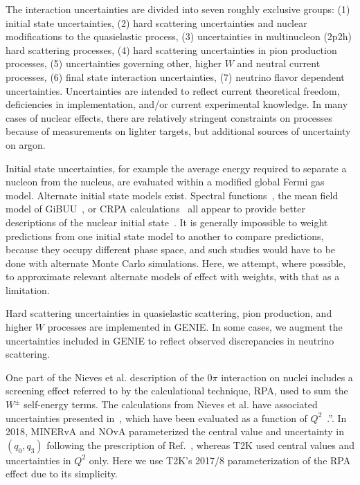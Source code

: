 The interaction uncertainties are divided into seven roughly exclusive groups: (1) initial state uncertainties, (2) hard scattering uncertainties and nuclear modifications to the quasielastic process, (3) uncertainties in multinucleon (2p2h) hard scattering processes, (4) hard scattering uncertainties in pion production processes, (5) uncertainties governing other, higher $W$ and neutral current processes, (6) final state interaction uncertainties, (7) neutrino flavor dependent uncertainties. Uncertainties are intended to reflect current theoretical freedom, deficiencies in implementation, and/or current experimental knowledge.  In many cases of nuclear effects, there are relatively stringent constraints on processes because of measurements on lighter targets, but additional sources of uncertainty on argon. 


Initial state uncertainties, for example the average energy required to separate a nucleon from the nucleus, are evaluated within a modified global Fermi gas model.  Alternate initial state models exist. Spectral functions~\cite{Benhar:1994hw,Nieves:2004wx}, the mean field model of GiBUU~\cite{Gallmeister:2016dnq}, or CRPA calculations~\cite{Pandey:2014tza} all appear to  provide better descriptions of the nuclear initial state~\cite{Sobczyk:2017mts}.   It is generally impossible to weight predictions from one initial state model to another to compare predictions, because they occupy different phase space, and such studies would have to be done with alternate Monte Carlo simulations. Here, we attempt, where possible, to approximate relevant alternate models of effect with weights, with that as a limitation.

Hard scattering uncertainties in quasielastic scattering,  pion production, and higher $W$ processes are implemented in GENIE.  In some cases, we augment the uncertainties included in GENIE to reflect observed discrepancies in neutrino scattering.

One part of the Nieves et al.\cite{nieves1,nieves2} description of the $0\pi$ interaction on nuclei includes a screening effect referred to by the calculational technique, RPA, used to sum the $W^\pm$ self-energy terms. 
The calculations from Nieves et al. have associated uncertainties presented in \cite{nieves_uncert}, which have been evaluated as a function of $Q^2$~\cite{sanchez-private}.”.
 In 2018, MINERvA and NOvA parameterized the central value and uncertainty in $(q_0, q_3)$ following the prescription of Ref.~\cite{RikRPA}, whereas T2K used central values and uncertainties in $Q^2$ only. Here we use T2K's 2017/8 parameterization of the RPA effect\cite{t2k_2018} due to its simplicity.

